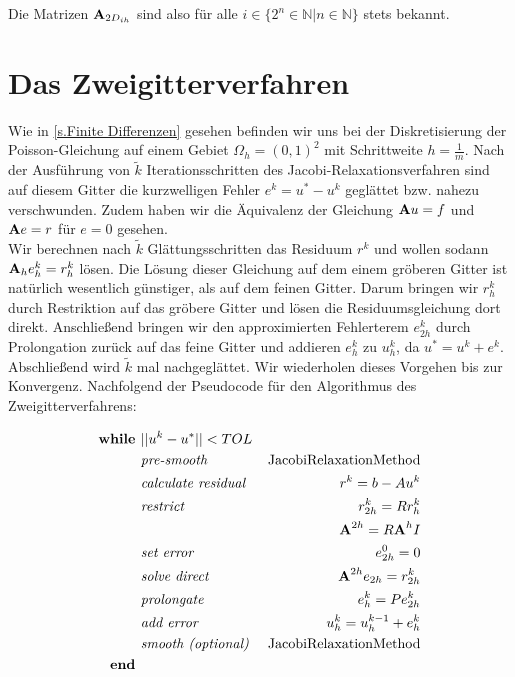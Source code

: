 Die Matrizen ${\textbf{A}}_{2D_{ih}}$ sind also für alle $i \in \{2^{n} \in \mathbb{N} | n \in \mathbb{N} \}$ stets bekannt.

\section{Das Zweigitterverfahren}\label{s.Der Zweigitter-Algorithmus}

Wie in \autoref{s.Finite Differenzen} gesehen befinden wir uns bei der Diskretisierung der Poisson-Gleichung auf einem Gebiet $\Omega_{h} = (0,1)^{2}$ mit Schrittweite $h = \frac {1} {m}$. Nach der Ausführung von $\tilde k$ Iterationsschritten des Jacobi-Relaxationsverfahren sind auf diesem Gitter die kurzwelligen Fehler $e^{k} = u^{*} - u^{k}$ geglättet bzw. nahezu verschwunden. Zudem haben wir die Äquivalenz der Gleichung ${\textbf{A}} u = f$ und ${\textbf{A}} e = r$ für $e = 0$ gesehen.\\
Wir berechnen nach $\tilde k$ Glättungsschritten das Residuum $r^{k}$ und wollen sodann ${\textbf{A}}_{h} e^{k}_{h} = r^{k}_{h}$ lösen. Die Lösung dieser Gleichung auf dem einem gröberen Gitter ist natürlich wesentlich günstiger, als auf dem feinen Gitter. Darum bringen wir $r^{k}_{h}$ durch Restriktion auf das gröbere Gitter und lösen die Residuumsgleichung dort direkt. Anschließend bringen wir den approximierten Fehlerterem $e_{2h}^{k}$ durch Prolongation zurück auf das feine Gitter und addieren $e_{h}^{k}$ zu $u_{h}^{k}$, da $u^{*} = u^{k} + e^{k}$. Abschließend wird $\tilde k$ mal nachgeglättet. Wir wiederholen dieses Vorgehen bis zur Konvergenz. Nachfolgend der Pseudocode für den Algorithmus des Zweigitterverfahrens:

\begin{eqnarray}
\textbf{while }                                 &||u^{k} - u^{*}|| < TOL \notag \\
&\textit{pre-smooth }                         &\textnormal{JacobiRelaxationMethod} \notag \\
&\textit{calculate residual }        &r^{k} = b - Au^{k} \notag \\
&\textit{restrict }                         &r^{k}_{2h}=Rr^{k}_{h} \notag \\
&                                                                &{\textbf{A}}^{2h} = R{\textbf{A}}^{h}I \notag \\
&\textit{set error }                        &e^{0}_{2h} = 0 \notag \\
&\textit{solve direct }                        &{\textbf{A}}^{2h} e_{2h} = r^{k}_{2h} \notag \\
&\textit{prolongate }                        &e^{k}_{h} = Pe^{k}_{2h} \notag \\
&\textit{add error }                        &u^{k}_{h} = u^{k-1}_{h} + e^{k}_{h} \notag \\
&\textit{smooth (optional) }        &\textnormal{JacobiRelaxationMethod} \notag \\
\textbf{end } \notag
\end{eqnarray}

